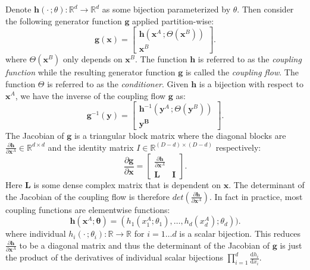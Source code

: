 Denote $\mathbf{h}(\mathbf{\cdot}\,; \theta): \mathbb{R}^d \to \mathbb{R}^d$
as some bijection parameterized by $\theta$. Then consider the following
generator function $\mathbf{g}$ applied partition-wise:
$$
\mathbf{g}(\mathbf{x}) =
\begin{bmatrix}
  \mathbf{h}(\mathbf{x}^A\,; \Theta(\mathbf{x}^B)) \\
  \mathbf{x}^B
\end{bmatrix}
.$$
where $\Theta(\mathbf{x}^B)$ only depends on $\mathbf{x}^B$. The function
$\mathbf{h}$ is referred to as the \textit{coupling function} while the resulting
generator function $\mathbf{g}$ is called the \textit{coupling flow}. The
function $\Theta$ is referred to as the \textit{conditioner}. Given
$\mathbf{h}$ is a bijection with respect to $\mathbf{x}^A$, we have the inverse
of the coupling flow $\mathbf{g}$ as:
$$
\mathbf{g}^{-1}(\mathbf{y}) =
\begin{bmatrix}
  \mathbf{h}^{-1}(\mathbf{y}^A\,; \Theta(\mathbf{y}^B)) \\
  \mathbf{\mathbf{y}^B}
\end{bmatrix}
.$$
The Jacobian of $\mathbf{g}$ is a triangular block matrix where the
diagonal blocks are $\frac{\partial \mathbf{h}}{\partial \mathbf{x}^A } \in
\mathbb{R}^{d \times d}$ and the
identity matrix $I \in \mathbb{R}^{(D-d) \times (D-d)}$ respectively:
$$
  \frac{\partial \mathbf{g}}{\partial \mathbf{x} } = \begin{bmatrix}
    \frac{\partial \mathbf{h}}{\partial \mathbf{x}^A } & \\
    \mathbf{L} & \mathbf{I}
  \end{bmatrix}
.$$
Here $\mathbf{L}$ is some dense complex matrix that is dependent on $\mathbf{x}$. The determinant of the Jacobian of the coupling flow is therefore
$det\left(\frac{\partial \mathbf{h}}{\partial \mathbf{x}^A }\right)$. In fact in practice, most coupling functions are elementwise functions:
$$
\mathbf{h}(\mathbf{x}^A; \mathbf{\theta}) = (h_1(x^A_1; \theta_1), \ldots,
h_d(x^A_d);
\theta_d))
.$$
where individual $h_i(\cdot \,;\theta_i): \mathbb{R} \to \mathbb{R}$ for $i=1
\ldots d$ is a scalar bijection. This reduces $\frac{\partial \mathbf{h}}{\partial
\mathbf{x}^A} $ to be a diagonal matrix and thus the determinant of the Jacobian of
$\mathbf{g}$ is just the product of the derivatives of individual scalar
bijections $\prod_{i=1}^d \frac{\text{d}h_i}{\text{d}x_i}$.

